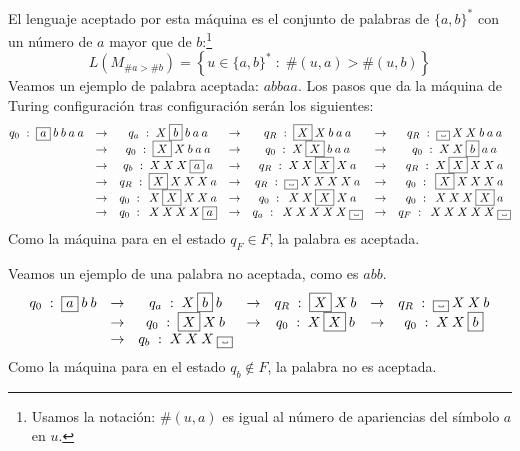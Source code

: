 \begin{ejemplo}
El lenguaje aceptado por esta máquina es el conjunto de palabras de $\{a,b\}^*$ con un número de $a$ mayor que de $b$:\footnote{Usamos la notación: $\#(u, a)$ es igual al número de apariencias del símbolo $a$ en $u$.}
$$
    L(M_{\#a>\#b})=\left\{ u\in\{a,b\}^*\;:\;\#(u,a)>\#(u,b) \right\}
$$
Veamos un ejemplo de palabra aceptada: $abbaa$. Los pasos que da la máquina de Turing configuración tras configuración serán los siguientes:
$$
    \begin{matrix}
        q_0\;:\;\fbox{$a$}\:b\:b\:a\:a & \rightarrow & q_a\;:\;X\:\fbox{$b$}\:b\:a\:a & \rightarrow & q_R\;:\;\fbox{$X$}\:X\:b\:a\:a & \rightarrow & q_R\;:\;\fbox{$\Vtextvisiblespace$}\:X\:X\:b\:a\:a \\
        & \rightarrow & q_0\;:\;\fbox{$X$}\:X\:b\:a\:a & \rightarrow & q_0\;:\;X\:\fbox{$X$}\:b\:a\:a & \rightarrow & q_0\;:\;X\:X\:\fbox{$b$}\:a\:a \\
        & \rightarrow & q_b\;:\;X\:X\:X\:\fbox{$a$}\:a & \rightarrow & q_R\;:\;X\:X\:\fbox{$X$}\:X\:a & \rightarrow & q_R\;:\;X\:\fbox{$X$}\:X\:X\:a \\
        & \rightarrow & q_R\;:\;\fbox{$X$}\:X\:X\:X\:a & \rightarrow & q_R\;:\;\fbox{$\Vtextvisiblespace$}\:X\:X\:X\:X\:a & \rightarrow & q_0\;:\;\:\fbox{$X$}\:X\:X\:X\:a \\
        & \rightarrow & q_0\;:\;\:X\:\fbox{$X$}\:X\:X\:a & \rightarrow & q_0\;:\;\:X\:X\:\fbox{$X$}\:X\:a & \rightarrow & q_0\;:\;\:X\:X\:X\:\fbox{$X$}\:a \\
        & \rightarrow & q_0\;:\;\:X\:X\:X\:X\:\fbox{$a$} & \rightarrow & q_a\;:\;\:X\:X\:X\:X\:X\:\fbox{$\Vtextvisiblespace$} & \rightarrow & q_F\;:\;\:X\:X\:X\:X\:X\:\fbox{$\Vtextvisiblespace$}
    \end{matrix}
$$
Como la máquina para en el estado $q_F\in F$, la palabra es aceptada.

Veamos un ejemplo de una palabra no aceptada, como es $abb$.
$$
    \begin{matrix}
        q_0\;:\;\fbox{$a$}\:b\:b & \rightarrow & q_a\;:\;X\:\fbox{$b$}\:b & \rightarrow & q_R\;:\;\fbox{$X$}\:X\:b & \rightarrow & q_R\;:\;\fbox{$\Vtextvisiblespace$}\:X\:X\:b \\
        & \rightarrow & q_0\;:\;\fbox{$X$}\:X\:b & \rightarrow & q_0\;:\;X\:\fbox{$X$}\:b & \rightarrow & q_0\;:\;X\:X\:\fbox{$b$} \\
        & \rightarrow & q_b\;:\;X\:X\:X\:\fbox{$\Vtextvisiblespace$}
    \end{matrix}
$$
Como la máquina para en el estado $q_b\notin F$, la palabra no es aceptada.


\end{ejemplo}
